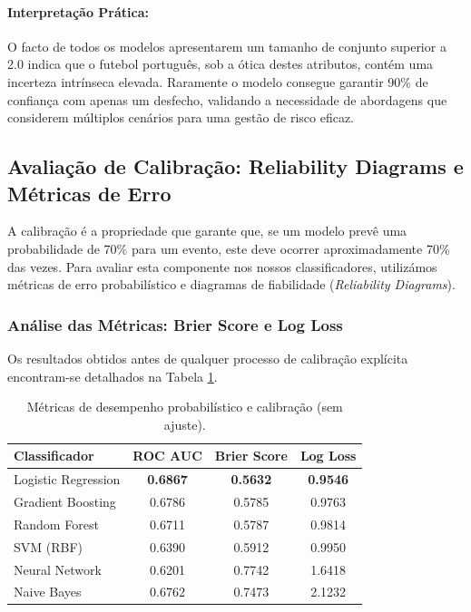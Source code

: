 \documentclass[10pt]{article}
\begin{document}
\paragraph{Interpretação Prática:}
O facto de todos os modelos apresentarem um tamanho de conjunto superior a 2.0 indica que o futebol português, sob a ótica destes atributos, contém uma incerteza intrínseca elevada. Raramente o modelo consegue garantir 90\% de confiança com apenas um desfecho, validando a necessidade de abordagens que considerem múltiplos cenários para uma gestão de risco eficaz.

\subsection{Avaliação de Calibração: Reliability Diagrams e Métricas de Erro}

A calibração é a propriedade que garante que, se um modelo prevê uma probabilidade de 70\% para um evento, este deve ocorrer aproximadamente 70\% das vezes. Para avaliar esta componente nos nossos classificadores, utilizámos métricas de erro probabilístico e diagramas de fiabilidade (\textit{Reliability Diagrams}).

\subsubsection{Análise das Métricas: Brier Score e Log Loss}
Os resultados obtidos antes de qualquer processo de calibração explícita encontram-se detalhados na Tabela \ref{tab:metrics_calibration}.

\begin{table}[H]
\centering
\begin{tabular}{lccc}
\hline
\textbf{Classificador} & \textbf{ROC AUC} & \textbf{Brier Score} & \textbf{Log Loss} \\ \hline
Logistic Regression & \textbf{0.6867} & \textbf{0.5632} & \textbf{0.9546} \\
Gradient Boosting & 0.6786 & 0.5785 & 0.9763 \\
Random Forest & 0.6711 & 0.5787 & 0.9814 \\
SVM (RBF) & 0.6390 & 0.5912 & 0.9950 \\
Neural Network & 0.6201 & 0.7742 & 1.6418 \\
Naive Bayes & 0.6762 & 0.7473 & 2.1232 \\ \hline
\end{tabular}
\caption{Métricas de desempenho probabilístico e calibração (sem ajuste).}
\label{tab:metrics_calibration}
\end{table}
\end{document}
